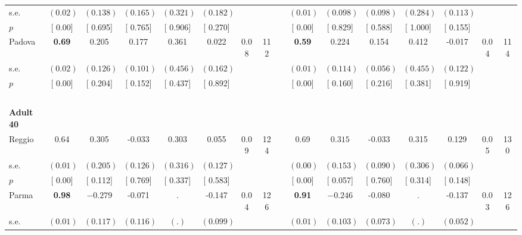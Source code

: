 \begin{longtable}{L{8em} c c c c c c c p{1em} c c c c c c c}
\quad \quad \quad \quad s.e.& $ (     0.02)$ & $ (    0.138)$ & $ (    0.165)$ & $ (    0.321)$ & $ (    0.182)$ & & & & $ (     0.01)$ & $ (    0.098)$ & $ (    0.098)$ & $ (    0.284)$ & $ (    0.113)$ & &  \\*
\quad \quad \quad \quad $ p$ & [     0.00] & [    0.695] & [    0.765] & [    0.906] & [    0.270] & & & & [     0.00] & [    0.829] & [    0.588] & [    1.000] & [    0.155] & &  \\[1em]
\quad \quad \quad Padova& \textbf{     0.69} &     0.205 &     0.177 &     0.361 &     0.022 &      0.08 &       112 & & \textbf{     0.59} &     0.224 &     0.154 &     0.412 &    -0.017 &      0.04 &       114  \\*
\quad \quad \quad \quad s.e.& $ (     0.02)$ & $ (    0.126)$ & $ (    0.101)$ & $ (    0.456)$ & $ (    0.162)$ & & & & $ (     0.01)$ & $ (    0.114)$ & $ (    0.056)$ & $ (    0.455)$ & $ (    0.122)$ & &  \\*
\quad \quad \quad \quad $ p$ & [     0.00] & [    0.204] & [    0.152] & [    0.437] & [    0.892] & & & & [     0.00] & [    0.160] & [    0.216] & [    0.381] & [    0.919] & &  \\[1em]
~\\[1em]
\quad \quad \textbf{Adult 40} & & & & & & & & & & & & & & & \\* 
\quad \quad \quad Reggio& 0.64 &     0.305 &    -0.033 &     0.303 &     0.055 &      0.09 &       124 & & 0.69 & $ \mathbf{    0.315}$ &    -0.033 &     0.315 &     0.129 &      0.05 &       130  \\*
\quad \quad \quad \quad s.e.& $ (     0.01)$ & $ (    0.205)$ & $ (    0.126)$ & $ (    0.316)$ & $ (    0.127)$ & & & & $ (     0.00)$ & $ (    0.153)$ & $ (    0.090)$ & $ (    0.306)$ & $ (    0.066)$ & &  \\*
\quad \quad \quad \quad $ p$ & [     0.00] & [    0.112] & [    0.769] & [    0.337] & [    0.583] & & & & [     0.00] & [    0.057] & [    0.760] & [    0.314] & [    0.148] & &  \\[1em]
\quad \quad \quad Parma& \textbf{     0.98} & $ \mathbf{   -0.279}$ &    -0.071 &         . &    -0.147 &      0.04 &       126 & & \textbf{     0.91} & $ \mathbf{   -0.246}$ &    -0.080 &         . &    -0.137 &      0.03 &       126  \\*
\quad \quad \quad \quad s.e.& $ (     0.01)$ & $ (    0.117)$ & $ (    0.116)$ & $ (        .)$ & $ (    0.099)$ & & & & $ (     0.01)$ & $ (    0.103)$ & $ (    0.073)$ & $ (        .)$ & $ (    0.052)$ & &  \\*

\end{longtable}
